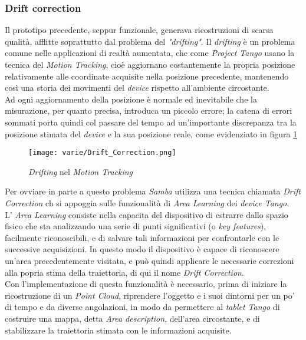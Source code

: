 \subsubsection{Drift correction}
Il prototipo precedente, seppur funzionale, generava ricostruzioni di scarsa qualità, afflitte soprattutto dal problema del \emph{"drifting"}. Il \emph{drifting} è un problema comune nelle applicazioni di realtà aumentata, che come \emph{Project Tango} usano la tecnica del \emph{Motion Tracking}, cioè aggiornano costantemente la propria posizione relativamente alle coordinate acquisite nella posizione precedente, mantenendo così una storia dei movimenti del \emph{device} rispetto all'ambiente circostante.\\
Ad ogni aggiornamento della posizione è normale ed inevitabile che la misurazione, per quanto precisa, introduca un piccolo errore; la catena di errori sommati porta quindi col passare del tempo ad un'importante discrepanza tra la posizione stimata del \emph{device} e la sua posizione reale, come evidenziato in figura \ref{fig:drift_correction}
\begin{figure}[!h] 
    \centering 
    \texttt{[image: varie/Drift\_Correction.png]} 
    \caption{\emph{Drifting} nel \emph{Motion Tracking}}
    \label{fig:drift_correction}
\end{figure}
\newline
Per ovviare in parte a questo problema \emph{Samba} utilizza una tecnica chiamata \emph{Drift Correction} ch si appoggia sulle funzionalità di \emph{Area Learning} dei \emph{device Tango}.\\
L' \emph{Area Learning} consiste nella capacita del dispositivo di estrarre dallo spazio fisico che sta analizzando una serie di punti significativi (o \emph{key features}), facilmente riconoscibili, e di salvare tali informazioni per confrontarle con le successive acquisizioni. In questo modo il dispositivo è capace di riconoscere un'area precedentemente visitata, e può quindi applicare le necessarie correzioni alla popria stima della traiettoria, di qui il nome \emph{Drift Correction}.\\
Con l'implementazione di questa funzionalità è necessario, prima di iniziare la ricostruzione di un \emph{Point Cloud}, riprendere l'oggetto e i suoi dintorni per un po' di tempo e da diverse angolazioni, in modo da permettere al \emph{tablet Tango} di costruire una mappa, detta \emph{Area description}, dell'area circostante, e di stabilizzare la traiettoria stimata con le informazioni acquisite.\\
